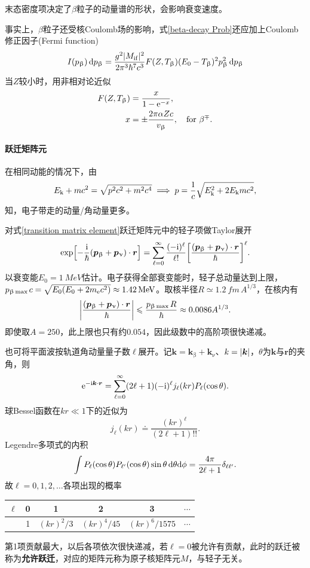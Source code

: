 末态密度项决定了$\beta$粒子的动量谱的形状，会影响衰变速度。

事实上，$\beta$粒子还受核Coulomb场的影响，式\eqref{beta-decay Prob}还应加上Coulomb修正因子(Fermi function)
\begin{align}\label{Fermi funtion}
	I(p_\upbeta)\mathop{}\!\mathrm{d} p_\upbeta = \frac{g^2\lvert M_{\mathrm i\mathrm f}\rvert^2}{2\pi^3\hbar^7c^3}F(Z,T_\upbeta)(E_0 - T_\upbeta)^2p_\upbeta^2\mathop{}\!\mathrm{d} p_\upbeta
\end{align}
当$Z$较小时，用非相对论近似
\begin{subequations}\label{eq:nrd-fermi-correction}
	\begin{align}
		F(Z,T_\upbeta) &= \frac x{1 - \mathop{}\!\mathrm{e}^{-x}},\\
		x &= \pm\frac{2\pi\alpha Zc}{v_\upbeta},\quad\text{for}~\beta^\mp.
	\end{align}
\end{subequations}
\paragraph{跃迁矩阵元}在相同动能的情况下，由
\[
	E_{\mathrm{k}} + mc^2 = \sqrt{p^2c^2 + m^2c^4} \implies p = \frac1c\sqrt{E_{\mathrm{k}}^2 + 2E_{\mathrm{k}} mc^2},
\]
知，电子带走的动量/角动量更多。

对式\eqref{transition matrix element}跃迁矩阵元中的轻子项做Taylor展开
\begin{align*}
	\exp\Bigl[-\frac{\mathrm{i}}\hbar(\bm p_\upbeta + \bm p_\upnu) \cdot \bm r\Bigr] = \sum_{\ell=0}^\infty\frac{(-\mathrm{i})^\ell}{\ell!}\biggl[\frac{(\bm p_\upbeta + \bm p_\upnu) \cdot \bm r}\hbar\biggr]^\ell.
\end{align*}
以衰变能$E_0 = \qty{1}{MeV}$估计。电子获得全部衰变能时，轻子总动量达到上限，$p_{\upbeta\max{}}c = \sqrt{E_0(E_0 + 2m_{\mathrm{e}} c^2)} \approx \qty{1.42}{MeV}$。取核半径$R \simeq \qty{1.2}{fm}\,A^{1/3}$，在核内有
\[
	\biggl\lvert\frac{(\bm p_\upbeta + \bm p_\upnu) \cdot \bm r}\hbar\biggr\rvert \leqslant \frac{p_{\upbeta\max{}}R}{\hbar} \approx 0.0086 A^{1/3}.
\]
即使取$A = 250$，此上限也只有约$0.054$，因此级数中的高阶项很快递减。

也可将平面波按轨道角动量量子数$\ell$展开。记$\bm k = \bm k_\upbeta + \bm k_\upnu$、$k = \lvert\bm k\rvert$，$\theta$为$\bm k$与$\bm r$的夹角，则
\[
	\mathop{}\!\mathrm{e}^{-\mathrm{i}\bm k\cdot\bm r} = \sum_{\ell=0}^\infty(2\ell + 1)(-\mathrm{i})^\ell j_\ell(kr)P_\ell(\cos\theta).
\]
球Bessel函数在$kr \ll 1$下的近似为
\[
	j_\ell(kr) \doteq \frac{(kr)^\ell}{(2\ell + 1)!!}.
\]
Legendre多项式的内积
\[
	\int P_\ell(\cos\theta)P_{\ell'}(\cos\theta)\sin\theta\mathop{}\!\mathrm{d}\theta\mathrm{d}\phi = \frac{4\pi}{2\ell + 1}\delta_{\ell\ell'}.
\]
故$\ell = 0,1,2,\ldots$各项出现的概率
\begin{center}
	\begin{tabular}{cccccc}
		\toprule
		$\ell$&0&1&2&3&$\cdots$\\
		\midrule
		&1&$(kr)^2/3$&$(kr)^4/45$&$(kr)^6/1575$&$\cdots$\\
		\bottomrule
	\end{tabular}
\end{center}
第1项贡献最大，以后各项依次很快递减，若$\ell = 0$被允许有贡献，此时的跃迁被称为\textbf{允许跃迁}，对应的矩阵元称为原子核矩阵元$M$，与轻子无关。

